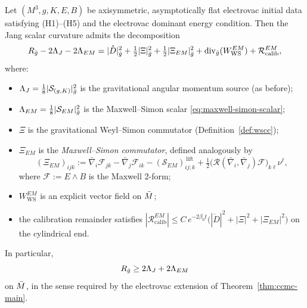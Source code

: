 \begin{theorem}\label{thm:electrovac-wscc}
Let $(M^3, g, K, E, B)$ be axisymmetric, asymptotically flat electrovac initial data satisfying (H1)--(H5) and the electrovac dominant energy condition. Then the Jang scalar curvature admits the decomposition
\begin{equation}\label{eq:electrovac-wscc}
R_{\bar{g}} - 2\Lambda_J - 2\Lambda_{EM} = |\mathring{D}|^2_{\bar{g}} + \tfrac{1}{2}|\Xi|^2_{\bar{g}} + \tfrac{1}{2}|\Xi_{EM}|^2_{\bar{g}} + \mathrm{div}_{\bar{g}}(W_{\mathrm{WS}}^{EM}) + \mathcal{R}_{\mathrm{calib}}^{EM},
\end{equation}
where:
\begin{itemize}
\item $\Lambda_J = \tfrac{1}{8}|\mathcal{S}_{(g,K)}|^2_{\bar{g}}$ is the gravitational angular momentum source (as before);
\item $\Lambda_{EM} = \tfrac{1}{8}|\mathcal{S}_{EM}|^2_{\bar{g}}$ is the Maxwell--Simon scalar \eqref{eq:maxwell-simon-scalar};
\item $\Xi$ is the gravitational Weyl--Simon commutator (Definition~\ref{def:wscc});
\item $\Xi_{EM}$ is the \emph{Maxwell--Simon commutator}, defined analogously by
\begin{equation}\label{eq:xi-em-def}
(\Xi_{EM})_{ijk} := \bar\nabla_i \mathcal{F}_{jk} - \bar\nabla_j \mathcal{F}_{ik} - (\mathcal{S}_{EM})_{ij;k}^{\,\mathrm{lift}} + \tfrac{1}{2}\bigl(\mathcal{R}(\bar\nabla_i,\bar\nabla_j)\mathcal{F}\bigr)_{k\ell}\nu^\ell,
\end{equation}
where $\mathcal{F} := E\wedge B$ is the Maxwell 2-form;
\item $W_{\mathrm{WS}}^{EM}$ is an explicit vector field on $\bar{M}$;
\item the calibration remainder satisfies $|\mathcal{R}_{\mathrm{calib}}^{EM}| \leq C\,e^{-2\beta_0 t}\bigl(|\mathring{D}|^2 + |\Xi|^2 + |\Xi_{EM}|^2\bigr)$ on the cylindrical end.
\end{itemize}
In particular,
\begin{equation}\label{eq:electrovac-refined-bk}
R_{\bar{g}} \geq 2\Lambda_J + 2\Lambda_{EM}
\end{equation}
on $\bar{M}$, in the sense required by the electrovac extension of Theorem~\ref{thm:ccmc-main}.
\end{theorem}

